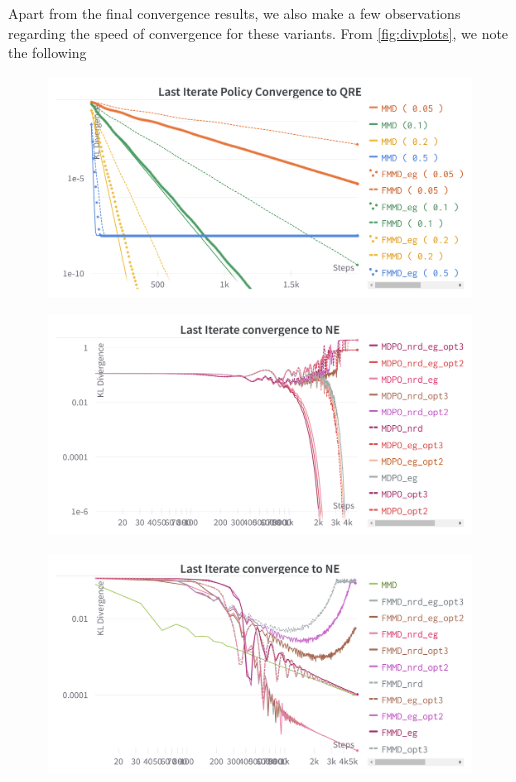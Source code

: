 Apart from the final convergence results, we also make a few observations regarding the speed of
convergence for these variants.
From \ref{fig:divplots}, we note the following

\begin{figure}[H]
	\includegraphics[width=15cm]{FIG/MMD_QRE.png}
\end{figure}

\begin{figure}[H]
	\includegraphics[width=15cm]{FIG/MDPO_NE.png}
\end{figure}

\begin{figure}[H]
	\includegraphics[width=15cm]{FIG/MMD_NE.png}
\end{figure}


